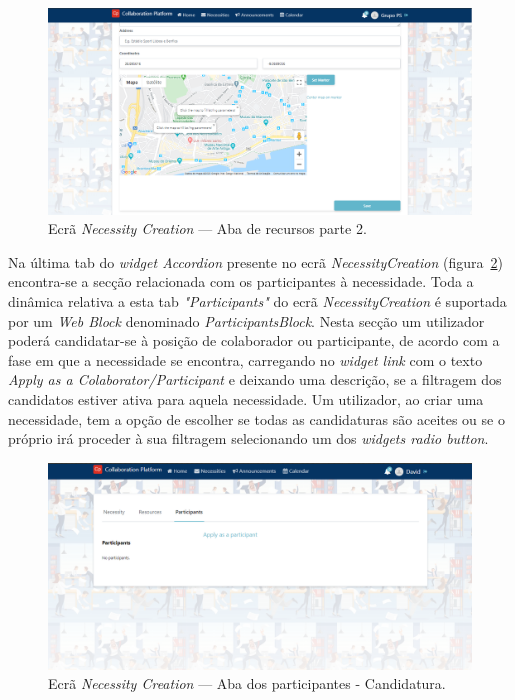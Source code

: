 \begin{figure}[H]
  \centering 
  \includegraphics[scale=0.4]{figures/Resources2.png}
  \caption{Ecrã \textit{Necessity Creation} --- Aba de recursos parte 2.}\label{fig:Resources2}
\end{figure}


Na última tab do \textit{widget Accordion} presente no ecrã \textit{NecessityCreation} (figura~\ref{fig:participants}) encontra-se a secção relacionada com os participantes à necessidade.
Toda a dinâmica relativa a esta tab \textit{"Participants"} do ecrã \textit{NecessityCreation} é suportada por um \textit{Web Block} denominado \textit{ParticipantsBlock}.
Nesta secção um utilizador poderá candidatar-se à posição de colaborador ou participante, de acordo com a fase em que a necessidade se encontra, carregando no \textit{widget link} com o texto \textit{Apply as a Colaborator/Participant} e deixando uma descrição, se a filtragem dos candidatos estiver ativa para aquela necessidade.
Um utilizador, ao criar uma necessidade, tem a opção de escolher se todas as candidaturas são aceites ou se o próprio irá proceder à sua filtragem selecionando um dos \textit{widgets radio button}.  

\begin{figure}[H]
  \centering 
  \includegraphics[scale=0.4]{figures/Participants.png}
  \caption{Ecrã \textit{Necessity Creation} --- Aba dos participantes - Candidatura.}\label{fig:participants}
\end{figure}

